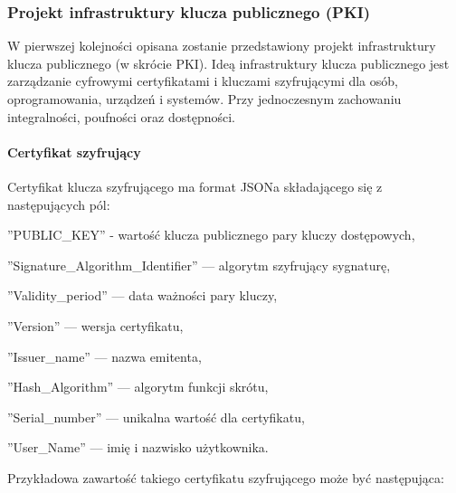 \subsubsection{Projekt infrastruktury klucza publicznego (PKI)}\label{sec:Projekt PKI}
W pierwszej kolejności opisana zostanie przedstawiony projekt infrastruktury klucza publicznego (w skrócie PKI). Ideą infrastruktury klucza publicznego jest zarządzanie cyfrowymi certyfikatami i kluczami szyfrującymi dla osób, oprogramowania, urządzeń i systemów. Przy jednoczesnym zachowaniu integralności, poufności oraz dostępności.
\paragraph*{Certyfikat szyfrujący}
Certyfikat klucza szyfrującego ma format JSONa składającego się z następujących pól:
\begin{itemize*}
	\item ''PUBLIC\_KEY” - wartość klucza publicznego pary kluczy dostępowych,
	\item ''Signature\_Algorithm\_Identifier'' --- algorytm szyfrujący sygnaturę,
	\item ''Validity\_period'' --- data ważności pary kluczy,
	\item ''Version'' --- wersja certyfikatu,
	\item ''Issuer\_name'' --- nazwa emitenta,
	\item ''Hash\_Algorithm'' --- algorytm funkcji skrótu,
	\item ''Serial\_number'' --- unikalna wartość dla certyfikatu,
	\item ''User\_Name'' --- imię i nazwisko użytkownika.
\end{itemize*}
\newpage
Przykładowa zawartość takiego certyfikatu szyfrującego może być następująca:\\
